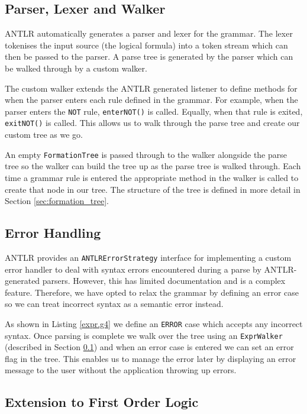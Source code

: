\documentclass{report}
\begin{document}
\subsection{Parser, Lexer and Walker}
\label{sub:walker}

ANTLR automatically generates a parser and lexer for the grammar. The lexer tokenises the input source (the logical formula) into a token stream which can then be passed to the parser. A parse tree is generated by the parser which can be walked through by a custom walker. 

The custom walker extends the ANTLR generated listener to define methods for when the parser enters each rule defined in the grammar. For example, when the parser enters the {\tt NOT} rule, {\tt enterNOT()} is called. Equally, when that rule is exited, {\tt exitNOT()} is called. This allows us to walk through the parse tree and create our custom tree as we go.

An empty {\tt FormationTree} is passed through to the walker alongside the parse tree so the walker can build the tree up as the parse tree is walked through. Each time a grammar rule is entered the appropriate method in the walker is called to create that node in our tree. The structure of the tree is defined in more detail in Section \ref{sec:formation_tree}.

\subsection{Error Handling}

ANTLR provides an {\tt ANTLRErrorStrategy} interface for implementing a custom error handler to deal with syntax errors encountered during a parse by ANTLR-generated parsers. However, this has limited documentation and is a complex feature. Therefore, we have opted to relax the grammar by defining an error case so we can treat incorrect syntax as a semantic error instead.

As shown in Listing \ref{expr.g4} we define an {\tt ERROR} case which accepts any incorrect syntax. Once parsing is complete we walk over the tree using an {\tt ExprWalker} (described in Section \ref{sub:walker}) and when an error case is entered we can set an error flag in the tree. This enables us to manage the error later by displaying an error message to the user without the application throwing up errors.

\subsection{Extension to First Order Logic}
\end{document}
